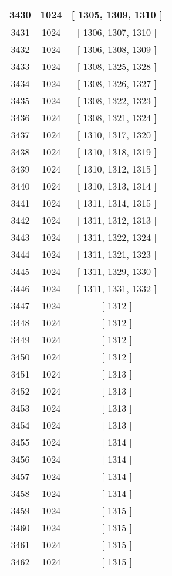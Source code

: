 \begin{center}
\begin{longtable}[H]{|| c c c ||}
\hline
3430 & 1024 & [ 1305, 1309, 1310 ] \\ 
\hline
3431 & 1024 & [ 1306, 1307, 1310 ] \\ 
\hline
3432 & 1024 & [ 1306, 1308, 1309 ] \\ 
\hline
3433 & 1024 & [ 1308, 1325, 1328 ] \\ 
\hline
3434 & 1024 & [ 1308, 1326, 1327 ] \\ 
\hline
3435 & 1024 & [ 1308, 1322, 1323 ] \\ 
\hline
3436 & 1024 & [ 1308, 1321, 1324 ] \\ 
\hline
3437 & 1024 & [ 1310, 1317, 1320 ] \\ 
\hline
3438 & 1024 & [ 1310, 1318, 1319 ] \\ 
\hline
3439 & 1024 & [ 1310, 1312, 1315 ] \\ 
\hline
3440 & 1024 & [ 1310, 1313, 1314 ] \\ 
\hline
3441 & 1024 & [ 1311, 1314, 1315 ] \\ 
\hline
3442 & 1024 & [ 1311, 1312, 1313 ] \\ 
\hline
3443 & 1024 & [ 1311, 1322, 1324 ] \\ 
\hline
3444 & 1024 & [ 1311, 1321, 1323 ] \\ 
\hline
3445 & 1024 & [ 1311, 1329, 1330 ] \\ 
\hline
3446 & 1024 & [ 1311, 1331, 1332 ] \\ 
\hline
3447 & 1024 & [ 1312 ] \\ 
\hline
3448 & 1024 & [ 1312 ] \\ 
\hline
3449 & 1024 & [ 1312 ] \\ 
\hline
3450 & 1024 & [ 1312 ] \\ 
\hline
3451 & 1024 & [ 1313 ] \\ 
\hline
3452 & 1024 & [ 1313 ] \\ 
\hline
3453 & 1024 & [ 1313 ] \\ 
\hline
3454 & 1024 & [ 1313 ] \\ 
\hline
3455 & 1024 & [ 1314 ] \\ 
\hline
3456 & 1024 & [ 1314 ] \\ 
\hline
3457 & 1024 & [ 1314 ] \\ 
\hline
3458 & 1024 & [ 1314 ] \\ 
\hline
3459 & 1024 & [ 1315 ] \\ 
\hline
3460 & 1024 & [ 1315 ] \\ 
\hline
3461 & 1024 & [ 1315 ] \\ 
\hline
3462 & 1024 & [ 1315 ] \\ 

\end{longtable}
\end{center}
